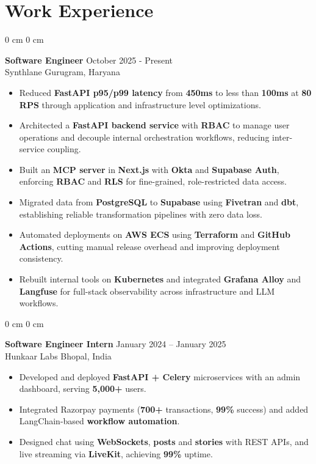 \documentclass[a4paper, 10pt]{article}
\newcommand{\blue}[1]{\textcolor[HTML]{002855}{#1}}
\newenvironment{onecolentry}{
    \begin{adjustwidth}{
       0 cm
    }{
        0 cm
    }
}{
    \end{adjustwidth}
} %
\begin{document}
\section{Work Experience}
\vspace{0.3em}


\begin{onecolentry}
    \textbf{Software Engineer} \hfill October 2025 -  Present \\
    \blue{Synthlane} \hfill Gurugram, Haryana
    \begin{itemize}

\item Reduced \textbf{FastAPI p95/p99 latency} from \textbf{450ms} to less than \textbf{100ms} at \textbf{80 RPS} through application and infrastructure level optimizations.

\item Architected a \textbf{FastAPI backend service} with \textbf{RBAC} to manage user operations and decouple internal orchestration workflows, reducing inter-service coupling.

\item Built an \textbf{MCP server} in \textbf{Next.js} with \textbf{Okta} and \textbf{Supabase Auth}, enforcing \textbf{RBAC} and \textbf{RLS} for fine-grained, role-restricted data access.

\item Migrated data from \textbf{PostgreSQL} to \textbf{Supabase} using \textbf{Fivetran} and \textbf{dbt}, establishing reliable transformation pipelines with zero data loss.

\item Automated deployments on \textbf{AWS ECS} using \textbf{Terraform} and \textbf{GitHub Actions}, cutting manual release overhead and improving deployment consistency.

\item Rebuilt internal tools on \textbf{Kubernetes} and integrated \textbf{Grafana Alloy} and \textbf{Langfuse} for full-stack observability across infrastructure and LLM workflows.

    \end{itemize}
\end{onecolentry}

\begin{onecolentry}
    \textbf{Software Engineer Intern} \hfill January 2024 -- January 2025 \\
    \blue{Hunkaar Labs} \hfill Bhopal, India
    \begin{itemize}
      \item Developed and deployed \textbf{FastAPI + Celery} microservices with an admin dashboard, serving \textbf{5,000+} users.
          \item Integrated Razorpay payments (\textbf{700+} transactions, \textbf{99\%} success) and added LangChain-based\textbf{ workflow automation}.
        \item Designed chat using \textbf{WebSockets}, \textbf{posts} and \textbf{stories} with REST APIs, and live streaming via \textbf{LiveKit}, achieving \textbf{99\%} uptime.
\end{itemize}
\end{onecolentry}
\end{document}

